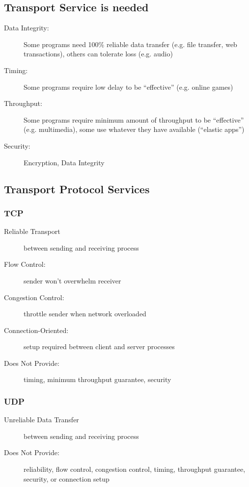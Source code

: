 \subsection{Transport Service is needed}
\begin{description}
	\item[Data Integrity:] Some programs need 100\% reliable data transfer (e.g. file transfer, web transactions), others can tolerate loss (e.g. audio)
	\item[Timing:] Some programs require low delay to be ``effective'' (e.g. online games)
	\item[Throughput:] Some programs require minimum amount of throughput to be ``effective'' (e.g. multimedia), some use whatever they have available (``elastic apps'')
	\item[Security:] Encryption, Data Integrity
\end{description}

\subsection{Transport Protocol Services}
\subsubsection{TCP}
\begin{description}
	\item[Reliable Transport] between sending and receiving process
	\item[Flow Control:] sender won't overwhelm receiver
	\item[Congestion Control:] throttle sender when network overloaded
	\item[Connection-Oriented:] setup required between client and server processes
	\item[Does Not Provide:] timing, minimum throughput guarantee, security
\end{description}

\subsubsection{UDP}
\begin{description}
	\item[Unreliable Data Transfer] between sending and receiving process
	\item[Does Not Provide:] reliability, flow control, congestion control, timing, throughput guarantee, security, or connection setup
\end{description}

